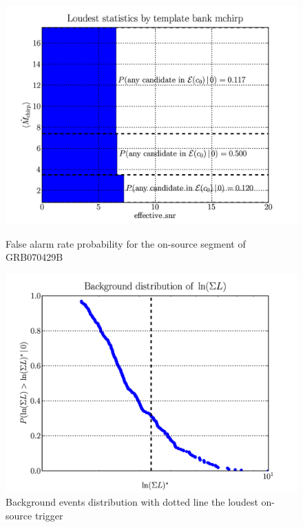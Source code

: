 \documentclass[epsf]{article}
\begin{document}
\begin{figure}[ht]
\begin{minipage}[b]{0.5\linewidth}
\centering
\includegraphics[scale=0.15]{FAR.png}
\caption{False alarm rate probability for the on-source segment of GRB070429B}
\label{fig:far}
\end{minipage}
\hspace{0.5cm}
\begin{minipage}[b]{0.5\linewidth}
\centering
\includegraphics[scale=0.15]{background.png}
\caption{Background events distribution with dotted line the loudest on-source trigger}
\label{fig:background}
\end{minipage}
\end{figure}
\end{document}
